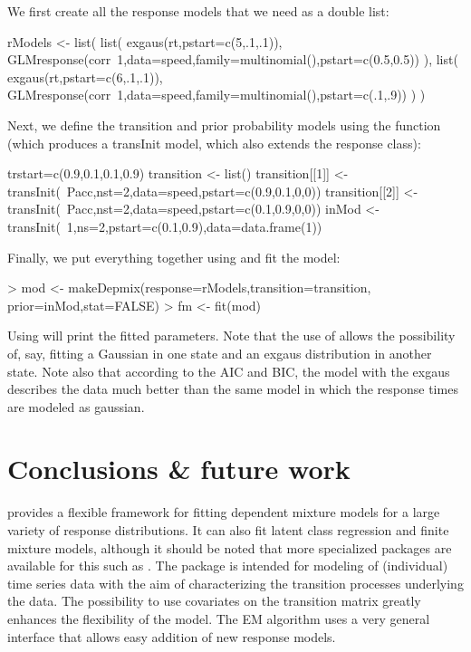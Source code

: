 \documentclass[article]{jss}
\begin{document}
We first create all the response models that we need as a double list: 
\begin{CodeChunk}
\begin{CodeInput}
rModels <- list(
  list(
    exgaus(rt,pstart=c(5,.1,.1)),
    GLMresponse(corr~1,data=speed,family=multinomial(),pstart=c(0.5,0.5))
  ),
  list(
    exgaus(rt,pstart=c(6,.1,.1)),
    GLMresponse(corr~1,data=speed,family=multinomial(),pstart=c(.1,.9))
  )
)
\end{CodeInput}
\end{CodeChunk}
Next, we define the transition and prior probability models using the 
 function (which produces a transInit model, which also extends 
the response class): 
\begin{CodeChunk}
\begin{CodeInput}
trstart=c(0.9,0.1,0.1,0.9)
transition <- list()
transition[[1]] <- transInit(~Pacc,nst=2,data=speed,pstart=c(0.9,0.1,0,0))
transition[[2]] <- transInit(~Pacc,nst=2,data=speed,pstart=c(0.1,0.9,0,0))
inMod <- transInit(~1,ns=2,pstart=c(0.1,0.9),data=data.frame(1))
\end{CodeInput}
\end{CodeChunk}
Finally, we put everything together using  and fit 
the model: 
\begin{CodeChunk}
\begin{CodeInput}
> mod <- makeDepmix(response=rModels,transition=transition,
    prior=inMod,stat=FALSE)
> fm <- fit(mod)
\end{CodeInput}
\end{CodeChunk}

Using  will print the fitted parameters.  Note that the
use of  allows the possibility of, say, fitting a
Gaussian in one state and an exgaus distribution in another state.
Note also that according to the AIC and BIC, the model with the exgaus
describes the data much better than the same model in which the
response times are modeled as gaussian.


\section[Conclusions and future work]{Conclusions \& future work}

 provides a flexible framework for fitting dependent
mixture models for a large variety of response distributions.  It can
also fit latent class regression and finite mixture models, although
it should be noted that more specialized packages are available for
this such as  \citep{Leisch2004}.  The package is
intended for modeling of (individual) time series data with the aim of
characterizing the transition processes underlying the data.  The
possibility to use covariates on the transition matrix greatly
enhances the flexibility of the model.  The EM algorithm uses a very
general interface that allows easy addition of new response models.
\end{document}
